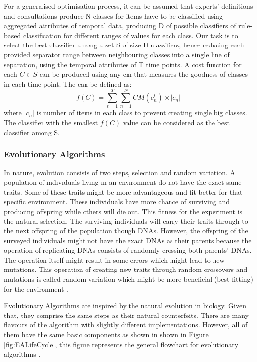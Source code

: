 For a generalised optimisation process, it can be assumed that experts' definitions and consultations produce N classes for items have to be classified using aggregated attributes of temporal data, producing D of possible classifiers of rule-based classification for different ranges of values for each class. Our task is to select the best classifier among a set S of size D classifiers, hence reducing each provided separator range between neighbouring classes into a single line of separation, using the temporal attributes of T time points. A cost function  for each $C \in S $ can be produced using any \acrfull{cm} that measures the goodness of classes in each time point. The can be defined as: 
\begin{equation*}
	f(C) = \sum_{t=1}^{T} \sum_{n=1}^{N} CM(c_{n}^{t}) \times \left | c_{n} \right |
\end{equation*}
where $ \left | c_{n} \right |$ is number of items in each class to prevent creating single big classes. The classifier with the smallest $f(C)$ value can be considered as the best classifier among S.

\subsubsection{Evolutionary Algorithms}

In nature, evolution consists of two steps, selection and random variation. A population of individuals living in an environment do not have the exact same traits. Some of these traits might be more advantageous and fit better for that specific environment. These individuals have more chance of surviving and producing offspring while others will die out. This fitness for the experiment is the natural selection. The surviving individuals will carry their traits through to the next offspring of the population though DNAs. However, the offspring of the surveyed individuals might not have the exact DNAs as their parents because the operation of replicating DNAs consists of randomly crossing both parents' DNAs. The operation itself might result in some errors which might lead to new mutations. This operation of creating new traits through random crossovers and mutations is called random variation which might be more beneficial (best fitting) for the environment
 \cite{Back1997}. 

Evolutionary Algorithms are inspired by the natural evolution in biology. Given that, they comprise the same steps as their natural counterfeits. There are many flavours of the algorithm with slightly different implementations. However, all of them have the same basic components as shown in shown in Figure \ref{fig:EALifeCycle}, this figure represents the general flowchart for evolutionary algorithms \cite{Eiben2015}.

